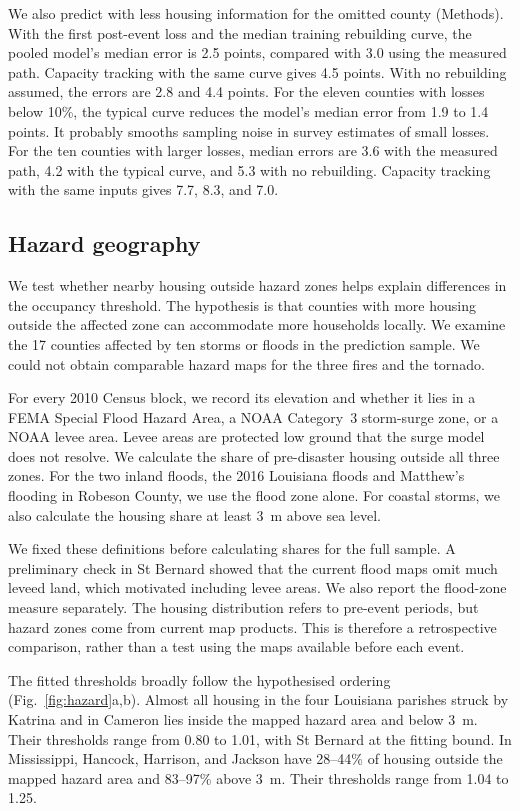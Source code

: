 \documentclass[11pt]{article}
\begin{document}
We also predict with less housing information for the omitted county (Methods). With the first post-event loss and the median training rebuilding curve, the pooled model's median error is 2.5 points, compared with 3.0 using the measured path. Capacity tracking with the same curve gives 4.5 points. With no rebuilding assumed, the errors are 2.8 and 4.4 points. For the eleven counties with losses below 10\%, the typical curve reduces the model's median error from 1.9 to 1.4 points. It probably smooths sampling noise in survey estimates of small losses. For the ten counties with larger losses, median errors are 3.6 with the measured path, 4.2 with the typical curve, and 5.3 with no rebuilding. Capacity tracking with the same inputs gives 7.7, 8.3, and 7.0.



\subsection{Hazard geography}\label{si:hazard}
We test whether nearby housing outside hazard zones helps explain differences in the occupancy threshold. The hypothesis is that counties with more housing outside the affected zone can accommodate more households locally. We examine the 17 counties affected by ten storms or floods in the prediction sample. We could not obtain comparable hazard maps for the three fires and the tornado.

For every 2010 Census block, we record its elevation and whether it lies in a FEMA Special Flood Hazard Area, a NOAA Category~3 storm-surge zone, or a NOAA levee area. Levee areas are protected low ground that the surge model does not resolve. We calculate the share of pre-disaster housing outside all three zones. For the two inland floods, the 2016 Louisiana floods and Matthew's flooding in Robeson County, we use the flood zone alone. For coastal storms, we also calculate the housing share at least 3~m above sea level.

We fixed these definitions before calculating shares for the full sample. A preliminary check in St Bernard showed that the current flood maps omit much leveed land, which motivated including levee areas. We also report the flood-zone measure separately. The housing distribution refers to pre-event periods, but hazard zones come from current map products. This is therefore a retrospective comparison, rather than a test using the maps available before each event.

The fitted thresholds broadly follow the hypothesised ordering (Fig.~\ref{fig:hazard}a,b). Almost all housing in the four Louisiana parishes struck by Katrina and in Cameron lies inside the mapped hazard area and below 3~m. Their thresholds range from 0.80 to 1.01, with St Bernard at the fitting bound. In Mississippi, Hancock, Harrison, and Jackson have 28--44\% of housing outside the mapped hazard area and 83--97\% above 3~m. Their thresholds range from 1.04 to 1.25.
\end{document}
